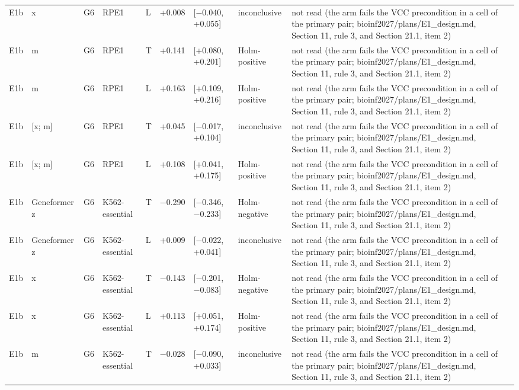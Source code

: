\begin{tabular}{llllllllll}
E1b & x & G6 & RPE1 & L & +0.008 & [−0.040, +0.055] & inconclusive & not read (the arm fails the VCC precondition in a cell of the primary pair; bioinf2027/plans/E1\_design.md, Section 11, rule 3, and Section 21.1, item 2) &  \\
E1b & m & G6 & RPE1 & T & +0.141 & [+0.080, +0.201] & Holm-positive & not read (the arm fails the VCC precondition in a cell of the primary pair; bioinf2027/plans/E1\_design.md, Section 11, rule 3, and Section 21.1, item 2) &  \\
E1b & m & G6 & RPE1 & L & +0.163 & [+0.109, +0.216] & Holm-positive & not read (the arm fails the VCC precondition in a cell of the primary pair; bioinf2027/plans/E1\_design.md, Section 11, rule 3, and Section 21.1, item 2) &  \\
E1b & [x; m] & G6 & RPE1 & T & +0.045 & [−0.017, +0.104] & inconclusive & not read (the arm fails the VCC precondition in a cell of the primary pair; bioinf2027/plans/E1\_design.md, Section 11, rule 3, and Section 21.1, item 2) &  \\
E1b & [x; m] & G6 & RPE1 & L & +0.108 & [+0.041, +0.175] & Holm-positive & not read (the arm fails the VCC precondition in a cell of the primary pair; bioinf2027/plans/E1\_design.md, Section 11, rule 3, and Section 21.1, item 2) &  \\
E1b & Geneformer z & G6 & K562-essential & T & −0.290 & [−0.346, −0.233] & Holm-negative & not read (the arm fails the VCC precondition in a cell of the primary pair; bioinf2027/plans/E1\_design.md, Section 11, rule 3, and Section 21.1, item 2) &  \\
E1b & Geneformer z & G6 & K562-essential & L & +0.009 & [−0.022, +0.041] & inconclusive & not read (the arm fails the VCC precondition in a cell of the primary pair; bioinf2027/plans/E1\_design.md, Section 11, rule 3, and Section 21.1, item 2) &  \\
E1b & x & G6 & K562-essential & T & −0.143 & [−0.201, −0.083] & Holm-negative & not read (the arm fails the VCC precondition in a cell of the primary pair; bioinf2027/plans/E1\_design.md, Section 11, rule 3, and Section 21.1, item 2) &  \\
E1b & x & G6 & K562-essential & L & +0.113 & [+0.051, +0.174] & Holm-positive & not read (the arm fails the VCC precondition in a cell of the primary pair; bioinf2027/plans/E1\_design.md, Section 11, rule 3, and Section 21.1, item 2) &  \\
E1b & m & G6 & K562-essential & T & −0.028 & [−0.090, +0.033] & inconclusive & not read (the arm fails the VCC precondition in a cell of the primary pair; bioinf2027/plans/E1\_design.md, Section 11, rule 3, and Section 21.1, item 2) &  \\

\end{tabular}
